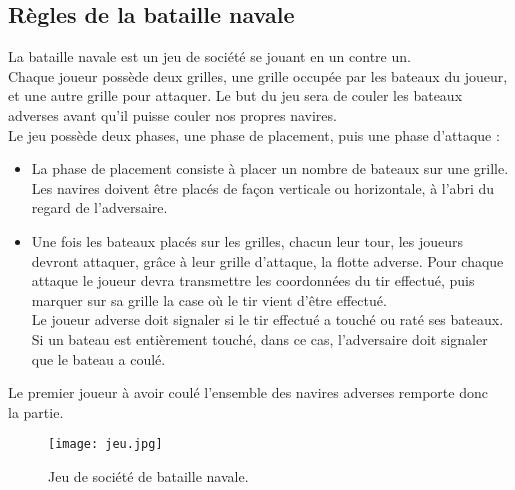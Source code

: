 \documentclass[12pt]{report}
\begin{document}
	\subsection{Règles de la bataille navale}
	La bataille navale est un jeu de société se jouant en un contre un.\\
	Chaque joueur possède deux grilles, une grille occupée par les bateaux du joueur, et une autre grille pour attaquer.
	Le but du jeu sera de couler les bateaux adverses avant qu'il puisse couler nos propres navires.\\
	Le jeu possède deux phases, une phase de placement, puis une phase d'attaque :
	\begin{itemize}
	\itemsep0em 
		\item La phase de placement consiste à placer un nombre de bateaux sur une grille. Les navires doivent être placés de façon verticale ou horizontale, à l'abri du regard de l'adversaire.
		\item Une fois les bateaux placés sur les grilles, chacun leur tour, les joueurs devront attaquer, grâce à leur grille d'attaque, la flotte adverse. Pour chaque attaque le joueur devra transmettre les coordonnées du tir effectué, puis marquer sur sa grille la case où le tir vient d'être effectué.\\
	Le joueur adverse doit signaler si le tir effectué a touché ou raté ses bateaux. Si un bateau est entièrement touché, dans ce cas, l'adversaire doit signaler que le bateau a coulé.
	\end{itemize}
	Le premier joueur à avoir coulé l'ensemble des navires adverses remporte donc\\la partie.
	\begin{figure}[h]
    	\begin{center}
		\texttt{[image: jeu.jpg]}
		\caption{Jeu de société de bataille navale.}
		\end{center}
	\end{figure}
\end{document}
